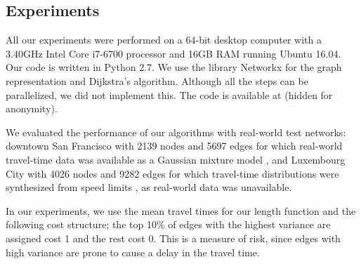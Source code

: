 
\subsection{Experiments} 
\label{sec:exp}

All our experiments were performed on a 64-bit desktop computer with a 3.40GHz Intel Core i7-6700 processor and 16GB RAM running Ubuntu 16.04.
Our code is written in Python 2.7.
We use the library Networkx for the graph representation and Dijkstra's algorithm.
Although all the steps can be parallelized, we did not implement this.
The code is available at (hidden for anonymity).%

We evaluated the performance of our algorithms with real-world test networks: downtown San Francisco with 2139 nodes and 5697 edges for which real-world travel-time data was available as a Gaussian mixture model \cite{sf_data}, and Luxembourg City with 4026 nodes and 9282 edges for which travel-time distributions were synthesized from speed limits \cite{niknami2016tractable}, as real-world data was unavailable.
 
In our experiments, we use the mean travel times for our length function and the following cost structure; the top 10\% of edges with the highest variance are assigned cost 1 and the rest cost 0.
This is a measure of risk, since edges with high variance are prone to cause a delay in the travel time.


